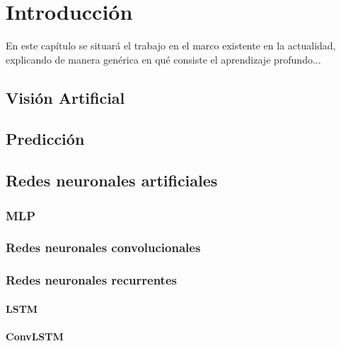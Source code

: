 \chapter{Introducción}\label{cap.introduccion}
En este capítulo se situará el trabajo en el marco existente en la actualidad, explicando de manera genérica en qué consiste el aprendizaje profundo...

\section{Visión Artificial}

\section{Predicción}

\section{Redes neuronales artificiales}
\subsection{MLP}
\subsection{Redes neuronales convolucionales}
\subsection{Redes neuronales recurrentes}
\subsubsection{LSTM}
\subsubsection{ConvLSTM}
